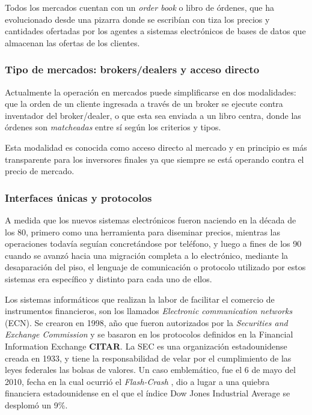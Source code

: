 Todos los mercados cuentan con un \emph{order book} o libro de órdenes, que ha
evolucionado desde una pizarra donde se escribían con tiza los precios y
cantidades ofertadas por los agentes a sistemas electrónicos de bases de datos
que almacenan las ofertas de los clientes.


\subsubsection{Tipo de mercados: brokers/dealers y acceso directo}

Actualmente la operación en mercados puede simplificarse en dos modalidades:
que la orden de un cliente ingresada a través de un broker se ejecute contra
inventador del broker/dealer, o que esta sea enviada a un libro centra, donde
las órdenes son \emph{matcheadas} entre sí según los criterios y tipos.

Esta modalidad es conocida como acceso directo al mercado y en principio es más 
transparente para los inversores finales ya que siempre se está operando contra 
el precio de mercado.


\subsubsection{Interfaces únicas y protocolos}
A medida que los nuevos sistemas electrónicos fueron naciendo en la década de
los 80, primero como una herramienta para diseminar precios, mientras las
operaciones todavía seguían concretándose por teléfono, y luego a fines de los
90 cuando se avanzó hacia una migración completa a lo electrónico, mediante la
desaparación del piso, el lenguaje de comunicación o protocolo utilizado por
estos sistemas era específico y distinto para cada uno de ellos.

Los sistemas informáticos que realizan la labor de facilitar el comercio de
instrumentos financieros, son los llamados \emph{Electronic communication
networks} (ECN).  Se crearon en 1998, año que fueron autorizados por la
\emph{Securities and Exchange Commission} y se basaron en los protocolos definidos 
en la Financial Information Exchange \textbf{CITAR}. La SEC \cite{hasbrouck2004economic}
es una organización estadounidense creada en 1933, y tiene la responsabilidad
de velar por el cumplimiento de las leyes federales las bolsas de valores. Un
caso emblemático, fue el 6 de mayo del 2010, fecha en la cual ocurrió el
\emph{Flash-Crash} \cite{arndt2011high}, dio a lugar a una quiebra financiera
estadounidense en el que el índice Dow Jones Industrial Average se desplomó un
9\%. 

